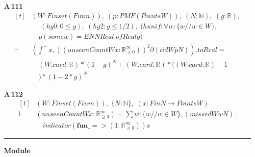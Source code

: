\noindent\textbf{A\,111}\quad{}
{\footnotesize\[ \begin{aligned}[t]
&(\mathit{W} : \mathit{Finset} (\mathit{Fin} \mathit{m})),\; (\mathit{p} : \mathit{PMF} (\mathit{Points} \mathit{W})),\; (\mathit{N} : \mathbb{N} ),\; (\mathit{g} : \mathbb{R} ),\\
&\quad \; (\mathit{hg0} : 0 \leq \mathit{g}),\; (\mathit{hg2} : \mathit{g} \leq 1/2),\; (\mathit{hunif} : \forall \mathit{w} : \{ \mathit{w} // \mathit{w} \in \mathit{W}\} ,\\
&\quad \mathit{p} (\mathit{some} \mathit{w}) = \mathit{ENNReal}.\mathit{ofReal} \mathit{g})\\
\vdash\;&(\int^{-} \mathit{x}, ((\mathit{unseenCount} \mathit{W} \mathit{x} : \mathbb{R}_{\geq0}^{\infty} ))^{2} ∂(\mathit{iid} \mathit{W} \mathit{p} \mathit{N})).\mathit{toReal} =\\
&\quad (\mathit{W}.\mathit{card} : \mathbb{R} ) * (1 - \mathit{g})^{\mathit{N}} + (\mathit{W}.\mathit{card} : \mathbb{R} ) * ((\mathit{W}.\mathit{card} : \mathbb{R} ) - 1\\
&\quad ) * (1 - 2*\mathit{g})^{\mathit{N}}
\end{aligned} \]}

\noindent\textbf{A\,112}\quad{}
{\footnotesize\[ \begin{aligned}[t]
&(\mathit{W} : \mathit{Finset} (\mathit{Fin} \mathit{m})),\; \{ \mathit{N} : \mathbb{N} \},\; (\mathit{x} : \mathit{Fin} \mathit{N} \to \mathit{Points} \mathit{W})\\
\vdash\;&(\mathit{unseenCount} \mathit{W} \mathit{x} : \mathbb{R}_{\geq0}^{\infty} ) = \textstyle\sum \mathit{w} : \{ \mathit{w} // \mathit{w} \in \mathit{W}\} , (\mathit{missed} \mathit{W} \mathit{w} \mathit{N}).\\
&\quad \mathit{indicator} (\mathbf{fun} \mathit{\_} => (1:\mathbb{R}_{\geq0}^{\infty} )) \mathit{x}
\end{aligned} \]}

\vspace{4pt}\noindent\rule{\columnwidth}{0.4pt}\par\vspace{2pt}
\noindent\textbf{Module }\par\vspace{3pt}

